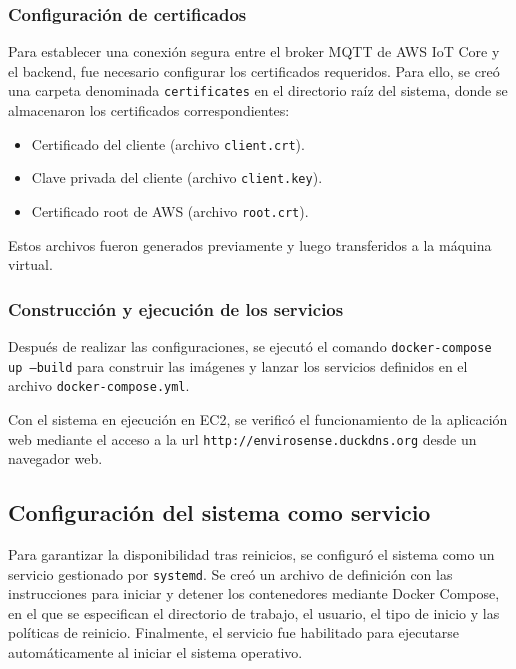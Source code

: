 \subsubsection{Configuración de certificados}

Para establecer una conexión segura entre el broker MQTT de AWS IoT Core y el
backend, fue necesario configurar los certificados requeridos. Para ello, se
creó una carpeta denominada \texttt{certificates} en el directorio raíz del
sistema, donde se almacenaron los certificados correspondientes:

\begin{itemize}
    \item Certificado del cliente (archivo \texttt{client.crt}).
    \item Clave privada del cliente (archivo \texttt{client.key}).
    \item Certificado root de AWS (archivo \texttt{root.crt}).
\end{itemize}

Estos archivos fueron generados previamente y luego transferidos a la máquina
virtual.

\subsubsection{Construcción y ejecución de los servicios}

Después de realizar las configuraciones, se ejecutó el comando
\texttt{docker-compose up --build} para construir las imágenes y lanzar los
servicios definidos en el archivo \texttt{docker-compose.yml}.

Con el sistema en ejecución en EC2, se verificó el funcionamiento de la
aplicación web mediante el acceso a la url
\texttt{http://envirosense.duckdns.org} desde un navegador web.

\subsection{Configuración del sistema como servicio}

Para garantizar la disponibilidad tras reinicios, se configuró el sistema como
un servicio gestionado por \texttt{systemd}. Se creó un archivo de definición
con las instrucciones para iniciar y detener los contenedores mediante Docker
Compose, en el que se especifican el directorio de trabajo, el usuario, el tipo
de inicio y las políticas de reinicio. Finalmente, el servicio fue habilitado
para ejecutarse automáticamente al iniciar el sistema operativo.

